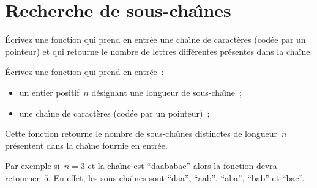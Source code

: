 \section{Recherche de sous-cha\^\i{}nes}
\label{sec:SousChaine}
\'Ecrivez une  fonction   qui prend  en entr\'ee une   cha\^\i{}ne  de
caract\`eres (cod\'ee  par un pointeur)  et qui  retourne le nombre de
lettres diff\'erentes pr\'esentes dans la cha\^i{}ne.
\par
\'Ecrivez une fonction qui prend en entr\'ee~:
\begin{itemize}
\item   un entier  positif~$n$   d\'esignant   une  longueur de   sous-cha\^\i{}ne~;
\item une cha\^\i{}ne de caract\`eres (cod\'ee par un pointeur)~;
\end{itemize}
Cette fonction retourne  le nombre de  sous-cha\^\i{}nes distinctes de
longueur~$n$ pr\'esentent dans la cha\^\i{}ne fournie en entr\'ee.
\par
Par  exemple si~${n=3}$  et la cha\^\i{}ne  est  ``daababac'' alors la
fonction  devra  retourner~$5$. En  effet,  les sous-cha\^\i{}nes sont
``daa'', ``aab'', ``aba'', ``bab'' et ``bac''.
